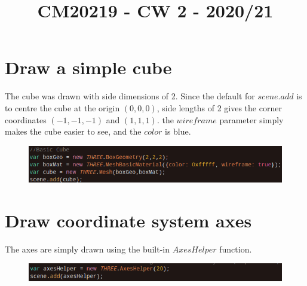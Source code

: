 \documentclass[12pt]{article}
\title{CM20219 - CW 2 - 2020/21}
\author{}
\begin{document}
\maketitle
\onehalfspacing
\section{Draw a simple cube}
The cube was drawn with side dimensions of 2. Since the default for $scene.add$ is to centre the cube
at the origin $(0,0,0)$, side lengths of 2 gives the corner coordinates $(-1,-1,-1)$ and $(1,1,1)$.
the $wireframe$ parameter simply makes the cube easier to see, and the $color$ is blue.
\begin{figure}[ht]  
    \centering
    \includegraphics[width=\textwidth]{1.png}
    \label{fig:1}
    \caption{}
  \end{figure}
\section{Draw coordinate system axes}
The axes are simply drawn using the built-in $AxesHelper$ function.
\begin{figure}[ht]  
    \centering
    \includegraphics[width=\textwidth]{2.png}
    \label{fig:2}
    \caption{}
  \end{figure}
\end{document}
